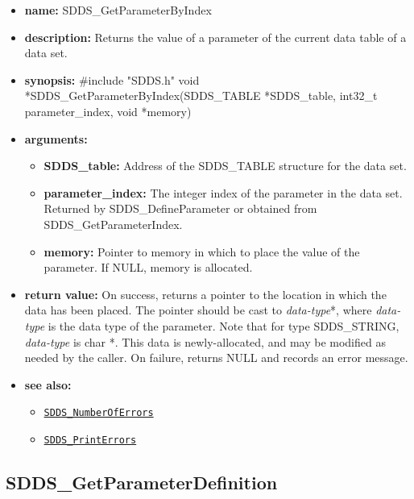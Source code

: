 \documentclass[11pt]{article}
\newcommand{\progref}[1]{\hyperref[SDDS_#1]{\tt SDDS\_#1}}
\begin{document}
\begin{itemize}
\item {\bf name:}\newline
SDDS\_GetParameterByIndex
\item {\bf description:}\newline
Returns the value of a parameter of the current data table of a data set.
\item {\bf synopsis:} \#include "SDDS.h"\newline
void *SDDS\_GetParameterByIndex(SDDS\_TABLE *SDDS\_table, int32\_t parameter\_index, void *memory)
\item {\bf arguments:}
\begin{itemize}
\item {\bf SDDS\_table:} Address of the SDDS\_TABLE structure for the data set.
\item {\bf parameter\_index:} The integer index of the parameter in the data set. Returned by SDDS\_DefineParameter or obtained from SDDS\_GetParameterIndex.
\item {\bf memory:} Pointer to memory in which to place the value of the parameter. If NULL, memory is allocated.
\end{itemize}
\item {\bf return value:}\newline
On success, returns a pointer to the location in which the data has been placed. The pointer should be cast to {\em data-type}*, where {\em data-type} is the data type of the parameter. Note that for type SDDS\_STRING, {\em data-type} is char *. This data is newly-allocated, and may be modified as needed by the caller. On failure, returns NULL and records an error message.
\item {\bf see also:}
\begin{itemize}
\item \progref{NumberOfErrors}
\item \progref{PrintErrors}
\end{itemize}
\end{itemize}

\subsection{SDDS\_GetParameterDefinition}
\label{SDDS_GetParameterDefinition}
\end{document}
